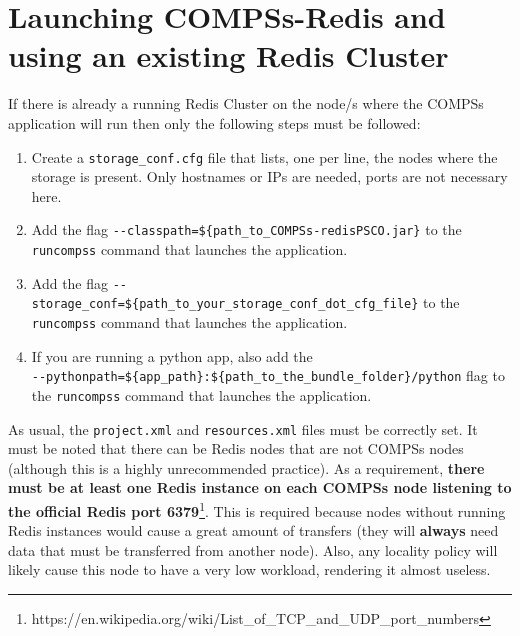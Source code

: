 \documentclass{article}
\begin{document}
  \section{Launching COMPSs-Redis and using an existing Redis Cluster}
  If there is already a running Redis Cluster on the node/s where the COMPSs application will run then only the following steps must be followed:
  \begin{enumerate}
  \item Create a \verb|storage_conf.cfg| file that lists, one per line, the nodes where the storage is present. Only hostnames or IPs are needed, ports are not necessary here.
  \item Add the flag \verb|--classpath=${path_to_COMPSs-redisPSCO.jar}| to the \verb|runcompss| command that launches the application.
  \item Add the flag \verb|--storage_conf=${path_to_your_storage_conf_dot_cfg_file}| to the \verb|runcompss| command that launches the application.
  \item If you are running a python app, also add the \\ \verb|--pythonpath=${app_path}:${path_to_the_bundle_folder}/python| flag to the \verb|runcompss| command that launches the application.
  \end{enumerate}
  As usual, the \verb|project.xml| and \verb|resources.xml| files must be correctly set. It must be noted that there can be Redis nodes that are not COMPSs nodes (although this is a highly unrecommended practice).
  As a requirement, \textbf{there must be at least one Redis instance on each COMPSs node listening to the official Redis port 6379}\footnote{https://en.wikipedia.org/wiki/List\_of\_TCP\_and\_UDP\_port\_numbers}. This is required because nodes without running Redis instances would cause a great amount of transfers (they will \textbf{always} need data that must be transferred from another node). Also, any locality policy will likely cause this node to have a very low workload, rendering it almost useless.
\end{document}

